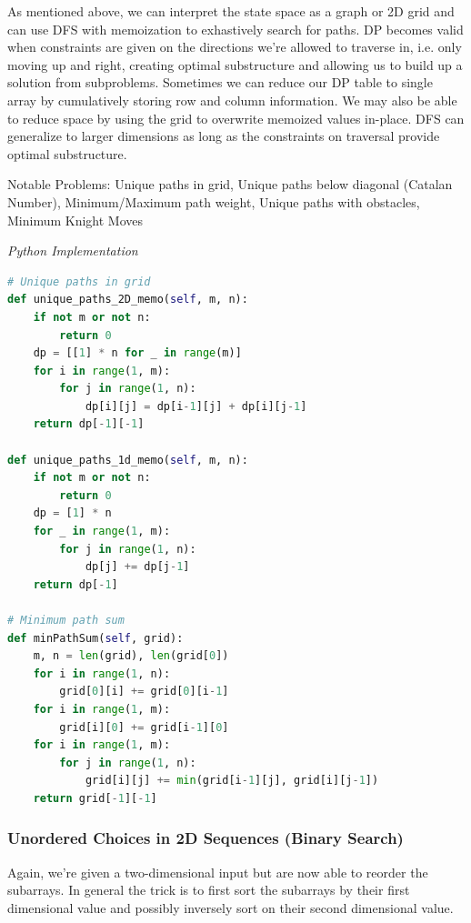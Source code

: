 \documentclass{article}
\newcommand{\comment}[1]{}
\begin{document}
As mentioned above, we can interpret the state space as a graph or 2D grid and can use DFS with memoization to exhastively search for paths. DP becomes valid when constraints are given on the directions we're allowed to traverse in, i.e. only moving up and right, creating optimal substructure and allowing us to build up a solution from subproblems. Sometimes we can reduce our DP table to single array by cumulatively storing row and column information. We may also be able to reduce space by using the grid to overwrite memoized values in-place. DFS can generalize to larger dimensions as long as the constraints on traversal provide optimal substructure.

Notable Problems: Unique paths in grid, Unique paths below diagonal (Catalan Number), Minimum/Maximum path weight, Unique paths with obstacles, Minimum Knight Moves

\vspace{8pt} \emph{Python Implementation}
\begin{lstlisting}[language=Python]
# Unique paths in grid
def unique_paths_2D_memo(self, m, n):
    if not m or not n:
        return 0
    dp = [[1] * n for _ in range(m)]
    for i in range(1, m):
        for j in range(1, n):
            dp[i][j] = dp[i-1][j] + dp[i][j-1]
    return dp[-1][-1]

def unique_paths_1d_memo(self, m, n):
    if not m or not n:
        return 0
    dp = [1] * n
    for _ in range(1, m):
        for j in range(1, n):
            dp[j] += dp[j-1]
    return dp[-1]
    
# Minimum path sum
def minPathSum(self, grid):
    m, n = len(grid), len(grid[0])
    for i in range(1, n):
        grid[0][i] += grid[0][i-1]
    for i in range(1, m):
        grid[i][0] += grid[i-1][0]
    for i in range(1, m):
        for j in range(1, n):
            grid[i][j] += min(grid[i-1][j], grid[i][j-1])
    return grid[-1][-1]
\end{lstlisting}

\subsubsection*{Unordered Choices in 2D Sequences (Binary Search)}

\comment{
def bisect_left(A, val):
    lo, hi = 0, len(A) - 1
    while lo <= hi:
        mid = (lo + hi) //2
        if A[mid] < val:
            lo = mid + 1
        elif val < A[mid]:
            hi = mid - 1
        else:
            return mid
    return lo
}
Again, we're given a two-dimensional input but are now able to reorder the subarrays. In general the trick is to first sort the subarrays by their first dimensional value and possibly inversely sort on their second dimensional value. 
\end{document}
